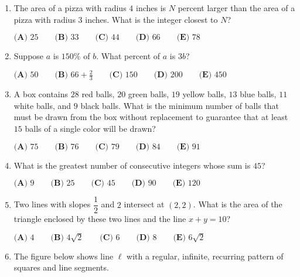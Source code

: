 \documentclass{article}
\begin{document}
\begin{enumerate}[label=\arabic*., itemsep=0.5em]\item The area of a pizza with radius \(4\) inches is \(N\) percent larger than the area of a pizza with radius \(3\) inches. What is the integer closest to \(N\)?

\(\textbf{(A) } 25 \qquad\textbf{(B) } 33 \qquad\textbf{(C) } 44\qquad\textbf{(D) } 66 \qquad\textbf{(E) } 78\)\par \vspace{0.5em}\item Suppose \(a\) is \(150\%\) of \(b\). What percent of \(a\) is \(3b\)?

\(\textbf{(A) } 50 \qquad \textbf{(B) } 66+\frac{2}{3} \qquad \textbf{(C) } 150 \qquad \textbf{(D) } 200 \qquad \textbf{(E) } 450\)\par \vspace{0.5em}\item A box contains \(28\) red balls, \(20\) green balls, \(19\) yellow balls, \(13\) blue balls, \(11\) white balls, and \(9\) black balls. What is the minimum number of balls that must be drawn from the box without replacement to guarantee that at least \(15\) balls of a single color will be drawn?

\(\textbf{(A) } 75 \qquad\textbf{(B) } 76 \qquad\textbf{(C) } 79 \qquad\textbf{(D) } 84 \qquad\textbf{(E) } 91\)\par \vspace{0.5em}\item What is the greatest number of consecutive integers whose sum is \(45\)?

\(\textbf{(A) } 9 \qquad\textbf{(B) } 25 \qquad\textbf{(C) } 45 \qquad\textbf{(D) } 90 \qquad\textbf{(E) } 120\)\par \vspace{0.5em}\item Two lines with slopes \(\dfrac{1}{2}\) and \(2\) intersect at \((2,2)\). What is the area of the triangle enclosed by these two lines and the line \(x+y=10\)?

\(\textbf{(A) } 4 \qquad\textbf{(B) } 4\sqrt{2} \qquad\textbf{(C) } 6 \qquad\textbf{(D) } 8 \qquad\textbf{(E) } 6\sqrt{2}\)\par \vspace{0.5em}\item The figure below shows line \(\ell\) with a regular, infinite, recurring pattern of squares and line segments.



\end{enumerate}
\end{document}
